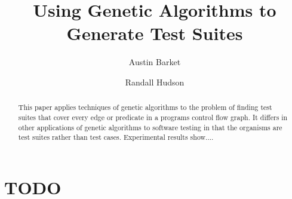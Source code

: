 \documentclass[runningheads]{llncs}
\begin{document}
\pagestyle{headings}
\mainmatter

\title{Using Genetic Algorithms to Generate Test Suites}
\titlerunning{}
\author{Austin Barket \and Randall Hudson}
 \maketitle

\begin{abstract}
This paper applies techniques of genetic algorithms to the problem of finding test suites that cover every edge or predicate in a programs control flow graph. It differs in other applications of genetic algorithms to software testing in that the organisms are test suites rather than test cases. Experimental results show....
\end{abstract}


\section{TODO}
\end{document}
